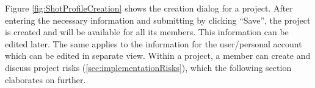 Figure \ref{fig:ShotProfileCreation} shows the creation dialog for a project. After entering the necessary information and submitting by clicking “Save”, the project is created and will be available for all its members. This information can be edited later. The same applies to the information for the user/personal account which can be edited in separate view. Within a project, a member can create and discuss project risks (\ref{sec:implementationRisks}), which the following section elaborates on further.


